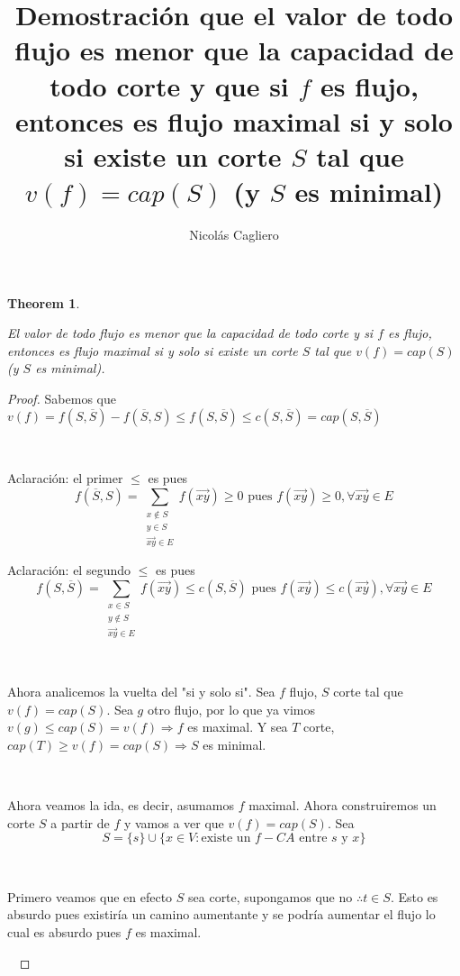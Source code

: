 \documentclass[11pt]{article}
\title{Demostración que el valor de todo flujo es menor que la capacidad de todo corte y que si $f$ es flujo, entonces es flujo maximal si y solo si existe un corte $S$ tal que $v(f) = cap(S)$ (y $S$ es minimal)}
\author{Nicolás Cagliero}
\newtheorem{theorem}{Theorem}
\begin{document}
\maketitle
\begin{theorem}\par
\

El valor de todo flujo es menor que la capacidad de todo corte y si $f$ es flujo, entonces es flujo maximal si y solo si existe un corte $S$ tal que $v(f) = cap(S)$ (y $S$ es minimal).
\end{theorem}

\begin{proof}
Sabemos que $v(f) = f(S, \overline{S}) - f(\overline{S}, S) \le f(S, \overline{S}) \le c(S, \overline{S}) = cap(S, \overline{S})$\par
\

Aclaración: el primer $\le$ es pues \[f(\overline{S}, S) = \sum_{\substack{x \notin S \\ y \in S \\ \overrightarrow{xy} \in E}} f(\overrightarrow{xy}) \ge 0 \text{ pues } f(\overrightarrow{xy}) \ge 0, \forall \overrightarrow{xy} \in E\]\par
Aclaración: el segundo $\le$ es pues  \[f(S, \overline{S}) = \sum_{\substack{x \in S \\ y \notin S \\ \overrightarrow{xy} \in E}} f(\overrightarrow{xy}) \le c(S, \overline{S}) \text{ pues } f(\overrightarrow{xy}) \le c(\overrightarrow{xy}), \forall \overrightarrow{xy} \in E\]\par
\

Ahora analicemos la vuelta del "si y solo si". Sea $f$ flujo, $S$ corte tal que $v(f) = cap(S)$. Sea $g$ otro flujo, por lo que ya vimos $v(g) \le cap(S) = v(f) \Rightarrow f $ es maximal. Y sea $T$ corte, $cap(T) \ge v(f) = cap(S) \Rightarrow S$ es minimal.\par
\

Ahora veamos la ida, es decir, asumamos $f$ maximal. Ahora construiremos un corte $S$ a partir de $f$ y vamos a ver que $v(f) = cap(S)$. Sea \[ S = \{s\} \cup \{x \in V: \text{existe un $f-CA$ entre $s$ y $x$}\} \]\par
\

Primero veamos que en efecto $S$ sea corte, supongamos que no $\therefore t \in S$. Esto es absurdo pues existiría un camino aumentante y se podría aumentar el flujo lo cual es absurdo pues $f$ es maximal.\par
\


\end{proof}
\end{document}
